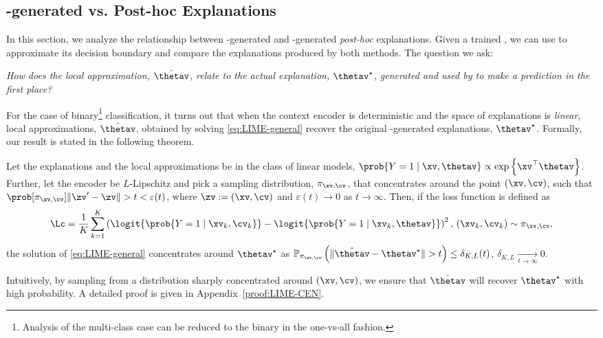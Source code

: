\documentclass[twoside,11pt]{article}
\begin{document}
\subsection{{\CEN}-generated vs. Post-hoc Explanations}
\label{sec:CEN-vs-LIME}

In this section, we analyze the relationship between {\CEN}-generated and {\LIME}-generated \emph{post-hoc} explanations.
Given a trained {\CEN}, we can use {\LIME} to approximate its decision boundary and compare the explanations produced by both methods.
The question we ask:

\begin{blockquote}
    \emph{How does the local approximation, $\hat \thetav$, relate to the actual explanation, $\thetav^\star$, generated and used by {\CEN} to make a prediction in the first place?}
\end{blockquote}

\noindent
For the case of binary\footnote{Analysis of the multi-class case can be reduced to the binary in the one-vs-all fashion.} classification, it turns out that when the context encoder is deterministic and the space of explanations is \emph{linear}, local approximations, $\hat\thetav$, obtained by solving \eqref{eq:LIME-general} recover the original {\CEN}-generated explanations, $\thetav^\star$.
Formally, our result is stated in the following theorem.

\begin{theorem}
\label{thm:LIME-CEN}
Let the explanations and the local approximations be in the class of linear models, $\prob{Y = 1 \mid \xv, \thetav} \propto \exp\left\{\xv^\top \thetav\right\}$.
Further, let the encoder be $L$-Lipschitz and pick a sampling distribution, $\pi_{\xv, \cv}$, that concentrates around the point $(\xv, \cv)$, such that $\prob[\pi_{\xv, \cv}]{\|\zv^\prime - \zv\| > t} < \varepsilon(t)$, where $\zv := (\xv, \cv)$ and $\varepsilon(t) \rightarrow 0$ as $t \rightarrow \infty$.
Then, if the loss function is defined as
\begin{equation}
    \Lc = \frac{1}{K} \sum_{k=1}^K \left(\logit{\prob{Y = 1 \mid \xv_k, \cv_k}} - \logit{\prob{Y = 1 \mid \xv_k, \thetav}}\right)^2,\, (\xv_k, \cv_k) \sim \pi_{\xv, \cv},
\end{equation}
the solution of \eqref{eq:LIME-general} concentrates around $\thetav^\star$ as $\mathbb{P}_{\pi_{\xv, \cv}}\left(\|\hat\thetav - \thetav^\star\| > t\right) \leq  \delta_{K, L}(t)$, $\delta_{K, L} \underset{t \rightarrow \infty}{\longrightarrow} 0$.
\end{theorem}
Intuitively, by sampling from a distribution sharply concentrated around $(\xv, \cv)$, we ensure that $\hat\thetav$ will recover $\thetav^\star$ with high probability.
A detailed proof is given in Appendix~\ref{proof:LIME-CEN}.
\end{document}
